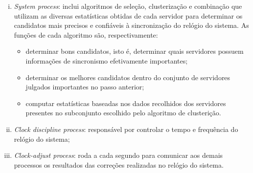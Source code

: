 \begin {enumerate}[i.]
	O \textit{poll process} é responsável, por sua vez, por enviar pacotes aos
	servidores a cada intervalo de \(2^\tau\) segundos. \(\tau\) varia de 4 a 17,
	resultando, assim, em intervalos de 16 segundos a 36 horas. O valor de \(\tau\)
	pode variar durante a execução, sendo modificado pelo algoritmo regulador do
	relógio, que será discutido posteriormente. 
	
	\item \textit{System process}: inclui algoritmos de seleção, clusterização e
	combinação que utilizam as diversas estatísticas obtidas de cada servidor para
	determinar os candidatos mais precisos e confiáveis à sincronização do relógio
	do sistema. As funções de cada algoritmo são, respectivamente:
		
		\begin{itemize}
  		  \renewcommand\labelitemi{--}
  		  \item determinar bons candidatos, isto é, determinar quais servidores
  		  possuem informações de sincronismo efetivamente importantes;
  		  \item determinar os melhores candidatos dentro do conjunto de servidores
  		  julgados importantes no passo anterior;
  		  \item computar estatísticas baseadas nos dados recolhidos dos servidores
  		  presentes no subconjunto escolhido pelo algoritmo de clusterição.
  		\end{itemize}
  	
  	\item \textit{Clock discipline process}: responsável por controlar o tempo e
  	frequência do relógio do sistema;
  	
  	\item \textit{Clock-adjust process}: roda a cada segundo para comunicar aos
  	demais processos os resultados das correções realizadas no relógio do
  	sistema.
  	
\end{enumerate}

